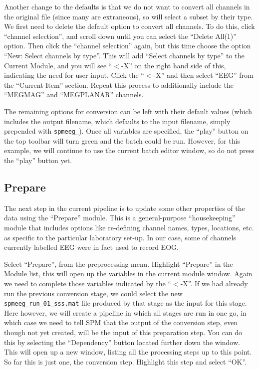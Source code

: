 Another change to the defaults is that we do not want to convert all channels in the original file (since many are extraneous), so will select a subset by their type. We first need to delete the default option to convert all channels. To do this, click ``channel selection'', and  scroll down until you can select the ``Delete All(1)'' option. Then click the ``channel selection'' again, but this time choose the option ``New: Select channels by type''. This will add ``Select channels by type'' to the Current Module, and you will see ``\(<\)-X'' on the right hand side of this, indicating the need for user input. Click the ``\(<\)-X'' and then select ``EEG'' from the ``Current Item'' section. Repeat this process to additionally include the ``MEGMAG'' and ``MEGPLANAR'' channels.

The remaining options for conversion can be left with their default values (which includes the output filename, which defaults to the input filename, simply prepended with \texttt{spmeeg\_}). Once all variables are specified, the ``play'' button on the top toolbar will turn green and the batch could be run. However, for this example, we will continue to use the current batch editor window, so do not press the ``play'' button yet.

\subsection{Prepare}

The next step in the current pipeline is to update some other properties of the data using the ``Prepare'' module. This is a general-purpose ``housekeeping'' module that includes options like re-defining channel names, types, locations, etc. as specific to the particular laboratory set-up. In our case, some of channels currently labelled EEG were in fact used to record EOG.

Select ``Prepare'', from the preprocessing menu. Highlight ``Prepare'' in the Module list, this will open up the variables in the current module window. Again we need to complete those variables indicated by the ``\(<\)-X''. If we had already run the previous conversion stage, we could select the new \texttt{spmeeg\_run\_01\_sss.mat} file produced by that stage as the input for this stage. Here however, we will create a pipeline in which all stages are run in one go, in which case we need to tell SPM that the output of the conversion step, even though not yet created, will be the input of this preparation step. You can do this by selecting the ``Dependency'' button located further down the window. This will open up a new window, listing all the processing steps up to this point. So far this is just one, the conversion step. Highlight this step and select ``OK''.

